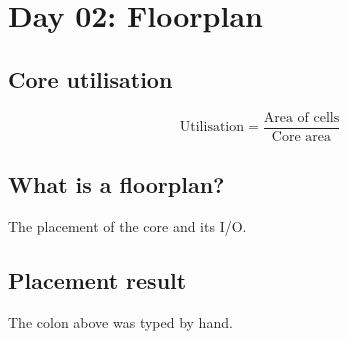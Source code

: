 \chapter{Day 02: Floorplan}
\label{sec:day_02_floorplan}


\section{Core utilisation}
\label{sec:core_utilisation}

\begin{equation}
    \text{Utilisation} = \frac{\text{Area of cells}}{\text{Core area}}
    \label{eq:core_utilisation_1}
\end{equation}

\section{What is a floorplan?}
\label{sec:what_is_a_floorplan}

The placement of the core and its I/O.

\section{Placement result}
\label{sec:placement_result}

The colon above was typed by hand.
